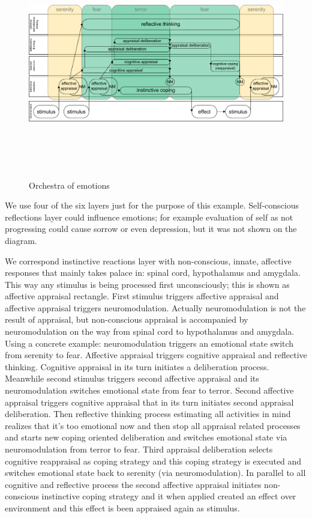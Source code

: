 \begin{figure}
\begin{center}
 \includegraphics[height=10cm, angle=90]{figure2_orchestra_of_emotions}
\end{center}
\caption{Orchestra of emotions}
\end{figure}

We use four of the six layers just for the purpose of this example. Self-conscious reflections layer could influence emotions; for example evaluation of self as not progressing could cause sorrow or even depression, but it was not shown on the diagram.

We correspond instinctive reactions layer with non-conscious, innate, affective responses that mainly takes palace in: spinal cord, hypothalamus and amygdala. This way any stimulus is being processed first unconsciously; this is shown as affective appraisal rectangle. First stimulus triggers affective appraisal and affective appraisal triggers neuromodulation. Actually neuromodulation is not the result of appraisal, but non-conscious appraisal is accompanied by neuromodulation on the way from spinal cord to hypothalamus and amygdala.
Using a concrete example: neuromodulation triggers an emotional state switch from serenity to fear. Affective appraisal triggers cognitive appraisal and reflective thinking. Cognitive appraisal in its turn initiates a deliberation process. Meanwhile second stimulus triggers second affective appraisal and its neuromodulation switches emotional state from fear to terror. Second affective appraisal triggers cognitive appraisal that in its turn initiates second appraisal deliberation. Then reflective thinking process estimating all activities in mind realizes that it's too emotional now and then stop all appraisal related processes and starts new coping oriented deliberation and switches emotional state via neuromodulation from terror to fear. Third appraisal deliberation selects cognitive reappraisal as coping strategy and this coping strategy is executed and switches emotional state back to serenity (via neuromodulation).
In parallel to all cognitive and reflective process the second affective appraisal initiates non-conscious instinctive coping strategy and it when applied created an effect over environment and this effect is been appraised again as stimulus.

